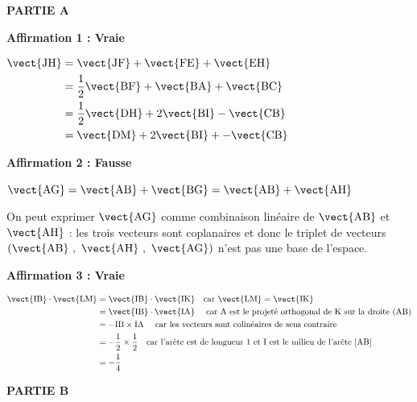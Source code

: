 \medskip

\textbf{PARTIE A}

\medskip

\textbf{Affirmation 1 : Vraie }

\smallskip

$\begin{aligned}\vect{\text{JH}} & = \vect{\text{JF}} +\vect{\text{FE}} +\vect{\text{EH}}\\
  & = \dfrac{1}{2}\vect{\text{BF}}+ \vect{\text{BA}}+\vect{\text{BC}}\\
  &=   \dfrac{1}{2}\vect{\text{DH}}+ 2\vect{\text{BI}}-\vect{\text{CB}}\\
  &  =\vect{\text{DM}}  + 2\vect{\text{BI}} + - \vect{\text{CB}}
  	\end{aligned}$

\textbf{Affirmation 2 : Fausse }

\smallskip

$\vect{\text{AG}}=\vect{\text{AB}}+\vect{\text{BG}} = \vect{\text{AB}}+\vect{\text{AH}}$

On peut exprimer $\vect{\mathrm{AG}}$ comme combinaison linéaire de $\vect{\mathrm{AB}}$ et $\vect{\mathrm{AH}}$ : les trois vecteurs sont coplanaires et donc le triplet de vecteurs $\left(\vect{\text{AB}}~,~\vect{\text{AH}}~,~ \vect{\text{AG}}\right)$ n'est pas  une base de l'espace.

\textbf{Affirmation 3 : Vraie}

\smallskip

$\begin{aligned}
	\vect{\text{IB}} \cdot \vect{\text{LM}} &= \vect{\text{IB}} \cdot \vect{\text{IK}}\quad \text{car }\vect{\mathrm{LM}} = \vect{\mathrm{IK}}\\
	&= \vect{\text{IB}} \cdot \vect{\text{IA}}\quad \text{ car A est le projeté orthogonal de K sur la droite (AB)}\\
	&= -{\text{IB}} \times {\text{IA}} \quad\text{ car les vecteurs sont colinéaires de sens contraire}\\
	&= - \dfrac 12 \times \dfrac 12 \quad\text{car l'arête est de longueur 1 et I est le milieu de l'arête [AB]}\\
	&= -\dfrac 14
\end{aligned}$

\bigskip

\textbf{PARTIE B}

\medskip








